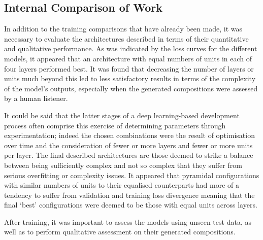 \documentclass[12pt,]{article}
\begin{document}
\hypertarget{internal-comparison-of-work}{%
\subsection{Internal Comparison of
Work}\label{internal-comparison-of-work}}

In addition to the training comparisons that have already been made, it
was necessary to evaluate the architectures described in terms of their
quantitative and qualitative performance. As was indicated by the loss
curves for the different models, it appeared that an architecture with
equal numbers of units in each of four layers performed best. It was
found that decreasing the number of layers or units much beyond this led
to less satisfactory results in terms of the complexity of the model's
outputs, especially when the generated compositions were assessed by a
human listener.

It could be said that the latter stages of a deep learning-based
development process often comprise this exercise of determining
parameters through experimentation; indeed the chosen combinations were
the result of optimisation over time and the consideration of fewer or
more layers and fewer or more units per layer. The final described
architectures are those deemed to strike a balance between being
sufficiently complex and not so complex that they suffer from serious
overfitting or complexity issues. It appeared that pyramidal
configurations with similar numbers of units to their equalised
counterparts had more of a tendency to suffer from validation and
training loss divergence meaning that the final `best' configurations
were deemed to be those with equal units across layers.

After training, it was important to assess the models using unseen test
data, as well as to perform qualitative assessment on their generated
compositions.
\end{document}
